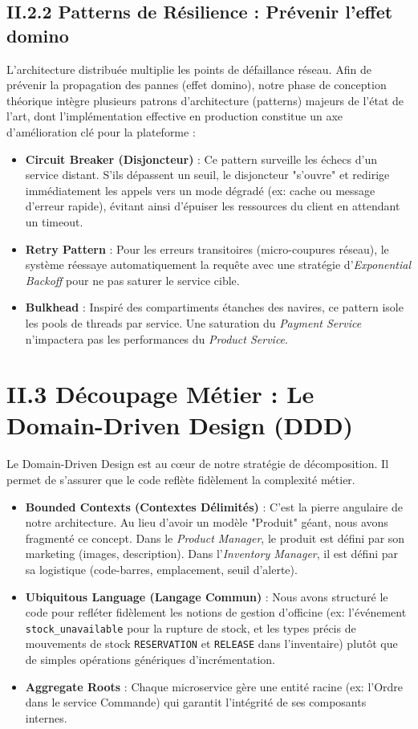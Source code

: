 \subsection{II.2.2 Patterns de Résilience : Prévenir l'effet domino}
L'architecture distribuée multiplie les points de défaillance réseau. Afin de prévenir la propagation des pannes (effet domino), notre phase de conception théorique intègre plusieurs patrons d'architecture (patterns) majeurs de l'état de l'art, dont l'implémentation effective en production constitue un axe d'amélioration clé pour la plateforme :
\begin{itemize}
    \item \textbf{Circuit Breaker (Disjoncteur)} : Ce pattern surveille les échecs d'un service distant. S'ils dépassent un seuil, le disjoncteur "s'ouvre" et redirige immédiatement les appels vers un mode dégradé (ex: cache ou message d'erreur rapide), évitant ainsi d'épuiser les ressources du client en attendant un timeout.
    \item \textbf{Retry Pattern} : Pour les erreurs transitoires (micro-coupures réseau), le système réessaye automatiquement la requête avec une stratégie d'\textit{Exponential Backoff} pour ne pas saturer le service cible.
    \item \textbf{Bulkhead} : Inspiré des compartiments étanches des navires, ce pattern isole les pools de threads par service. Une saturation du \textit{Payment Service} n'impactera pas les performances du \textit{Product Service}.
\end{itemize}

\section{II.3 Découpage Métier : Le Domain-Driven Design (DDD)}
\label{sec:ddd_advanced}

Le Domain-Driven Design est au cœur de notre stratégie de décomposition. Il permet de s'assurer que le code reflète fidèlement la complexité métier.
\begin{itemize}
    \item \textbf{Bounded Contexts (Contextes Délimités)} : C'est la pierre angulaire de notre architecture. Au lieu d'avoir un modèle "Produit" géant, nous avons fragmenté ce concept. Dans le \textit{Product Manager},
     le produit est défini par son marketing (images, description). Dans l'\textit{Inventory Manager}, il est défini par sa logistique (code-barres, emplacement, seuil d'alerte).
    \item \textbf{Ubiquitous Language (Langage Commun)} : Nous avons structuré le code pour refléter fidèlement les notions de gestion d'officine (ex: l'événement \texttt{stock\_unavailable} pour la rupture de stock, et les types précis de mouvements de stock \texttt{RESERVATION} et \texttt{RELEASE} dans l'inventaire) plutôt que de simples opérations génériques d'incrémentation.
    \item \textbf{Aggregate Roots} : Chaque microservice gère une entité racine (ex: l'Ordre dans le service Commande) qui garantit l'intégrité de ses composants internes.
\end{itemize}


